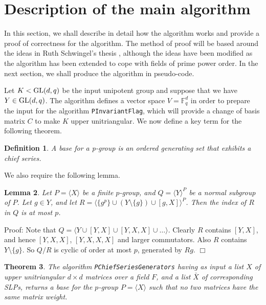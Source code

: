 \documentclass[12pt]{report}
\newtheorem{definition}{Definition}[section]
\newtheorem{lemma}[definition]{Lemma}
\newtheorem{theorem}[definition]{Theorem}
\newenvironment{proof}{\normalsize {\sc Proof}:}{{\hfill $\Box$ \\}}
\def\GL{{\rm GL}}
\begin{document}
  
\section{Description of the main algorithm}

In this section, we shall describe in detail how the algorithm works and provide a proof of correctness for the algorithm. The method of proof will be based around the ideas in Ruth Schwingel's thesis \cite{Ruth}, although the ideas have been modified as the algorithm has been extended to cope with fields of prime power order. In the next section, we shall produce the algorithm in pseudo-code.

Let $K < \GL(d, q)$ be the input unipotent group and suppose that we have $Y \in \GL(d, q)$. The algorithm defines a vector space $V = \mathbb{F}_q^d$ in order to prepare the input for the algorithm {\tt PInvariantFlag}, which will provide a change of basis matrix $C$ to make $K$ upper unitriangular. We now define a key term for the following theorem.

\begin{definition}
A base for a p-group is an ordered generating set that exhibits a chief series.
\end{definition}

We also require the following lemma.

\begin{lemma}
Let $P = \langle X \rangle$ be a finite $p$-group, and $Q = \langle Y \rangle^P$ be a normal subgroup of $P$. Let $g \in Y$, and let $R = \langle \{g^p\} \cup (Y \setminus \{g\}) \cup [g, X] \rangle^P$. Then the index of $R$ in $Q$ is at most $p$.
\end{lemma}

\begin{proof}
Note that $Q = \langle Y \cup [Y,X] \cup [Y,X,X] \cup \ldots \rangle$. Clearly $R$ contains $[Y,X]$, and hence $[Y,X,X]$, $[Y,X,X,X]$ and larger commutators. Also $R$ contains $Y \setminus \{g\}$. So $Q/R$ is cyclic of order at most $p$, generated by $Rg$.
\end{proof}

\begin{theorem}
The algorithm {\tt PChiefSeriesGenerators} having as input a list $X$ of upper unitriangular $d \times d$ matrices over a field $F$, and a list $\bar{X}$ of corresponding SLPs, returns a base for the $p$-group $P = \langle X \rangle$ such that no two matrices have the same matrix weight.
\end{theorem}
\end{document}
